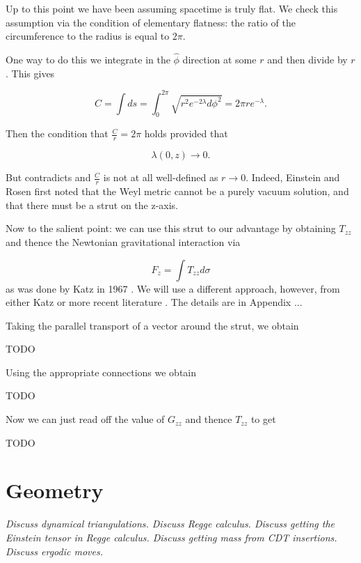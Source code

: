 \documentclass[12pt]{article}
\begin{document}
Up to this point we have been assuming spacetime is truly flat. We check this assumption via the condition of elementary flatness: the ratio of the circumference to the radius is equal to $2\pi$.

One way to do this we integrate in the $\hat{\phi}$ direction at
some $r$ and then divide by $r$. This gives

\begin{equation}
  \label{eq:phi-hat-length}
  C=\int ds =
  \int_0^{2\pi}\sqrt{r^2e^{-2\lambda}d\phi^2}={2\pi re^{-\lambda}}.
\end{equation}

Then the condition that $\frac{C}{r}=2\pi$ holds provided that

\begin{equation}
	\label{eq:lambda-elem-flat}
	\lambda(0,z)\rightarrow 0.
\end{equation}

But  contradicts  and $\frac{C}{r}$ is not at all well-defined as $r\rightarrow 0$. Indeed, Einstein and Rosen \cite{einstein-rosen-1936} first noted that the Weyl metric cannot be a purely vacuum solution, and that there must be a strut on the z-axis.

Now to the salient point: we can use this strut to our advantage by obtaining $T_{zz}$ and thence the Newtonian gravitational interaction via

\begin{equation}
	\label{eq:F_z}
	F_{z}=\int T_{zz}d\sigma
\end{equation}
as was done by Katz in 1967 \cite{katz1967derivation}. We will use a different approach, however, from either Katz or more recent literature \cite{letelier_superposition_1997}. The details are in Appendix ...

Taking the parallel transport of a vector around the strut, we obtain

TODO

Using the appropriate connections we obtain

TODO

Now we can just read off the value of $G_{zz}$ and thence $T_{zz}$ to get

TODO

\section{Geometry}

\textit{Discuss dynamical triangulations. Discuss Regge calculus. Discuss getting the Einstein tensor in Regge calculus. Discuss getting mass from CDT insertions. Discuss ergodic moves.}
\end{document}
